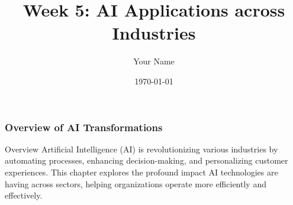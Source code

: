 \documentclass{beamer}
\title{Week 5: AI Applications across Industries}
\author{Your Name}
\institute{Your Institution}
\date{\today}
\begin{document}
\frame{\titlepage}

\begin{frame}[fragile]
    \titlepage
\end{frame}

\begin{frame}[fragile]
    \frametitle{Overview of AI Transformations}
    \begin{block}{Overview}
        Artificial Intelligence (AI) is revolutionizing various industries by automating processes, enhancing decision-making, and personalizing customer experiences. This chapter explores the profound impact AI technologies are having across sectors, helping organizations operate more efficiently and effectively.
    \end{block}
\end{frame}
\end{document}
